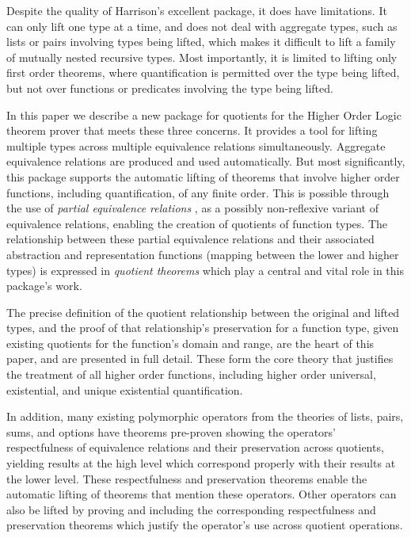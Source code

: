 \documentclass[envcountsame,runningheads]{llncs}
\newcommand{\quotient}{partial equivalence}
\begin{document}
Despite the quality of Harrison's excellent package, it does have
limitations.  It can only lift one type at a time,
and does not deal with aggregate types, such as lists or pairs
involving types being lifted,
which makes it difficult to lift a family of mutually nested recursive types.
Most importantly, it is limited to lifting only first order theorems,
where
quantification is permitted over the
type being lifted, but not over functions or predicates involving the type
being lifted.

In this paper we describe a new package for quotients for the Higher Order
Logic theorem prover that meets these three concerns.  It provides a tool
for lifting multiple types across multiple equivalence relations simultaneously.
Aggregate equivalence relations are produced and used automatically.
But most significantly,
this package supports the automatic
lifting of theorems that involve higher order functions, including
quantification, of any finite order. 
This is possible through the use of
{\it \quotient{} relations}
\cite{Rob89},
as a possibly non-reflexive variant of
equivalence relations, enabling the creation of quotients
of function types.
The relationship between these \quotient{} relations and their
associated abstraction and representation functions (mapping between the 
lower and higher types)
is expressed in {\it quotient theorems\/} which
play a central and vital role in this package's work.

The precise definition of the quotient relationship between the
original and lifted types, and the proof of that relationship's
preservation
for a function type,
given existing quotients
for the function's domain and range, are the heart of this paper,
and are presented in full detail.
These
form the core theory that
justifies the treatment of all higher order functions,
including higher order 
universal, existential, and unique existential quantification.

In addition, many existing polymorphic operators from the theories of
lists, pairs, sums, and options have theorems pre-proven
showing the operators' respectfulness of equivalence relations and
their
preservation
across
quotients,
yielding results at the
high level which correspond properly with their results at the lower level.
These respectfulness and
preservation
theorems enable the automatic
lifting of theorems that mention these operators.  Other operators
can also be lifted by proving and including
the corresponding respectfulness and
preservation
theorems which
justify the operator's use across quotient operations.
\end{document}
